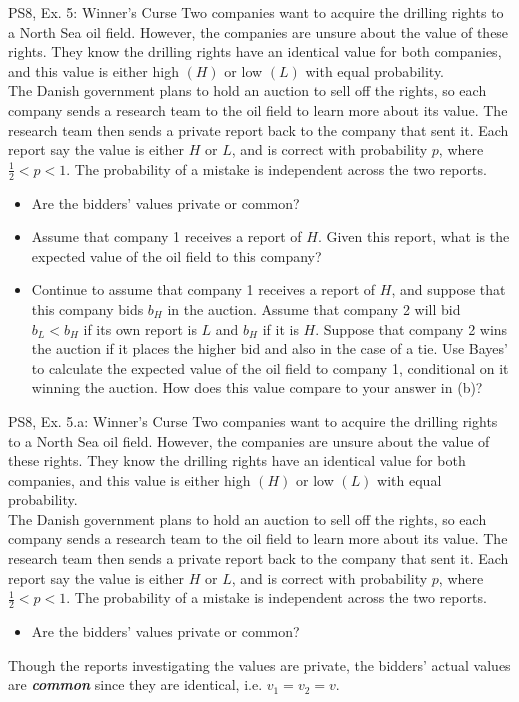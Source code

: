 \begin{frame}{PS8, Ex. 5: Winner's Curse}
      Two companies want to acquire the drilling rights to a North Sea oil field. However, the companies are unsure about the value of these rights. They know the drilling rights have an identical value for both companies, and this value is either high $(H)$ or low $(L)$ with equal probability.\\\medskip
      The Danish government plans to hold an auction to sell off the rights, so each company sends a research team to the oil field to learn more about its value. The research team then sends a private report back to the company that sent it. Each report say the value is either $H$ or $L$, and is correct with probability $p$, where $\frac{1}{2} < p < 1$. The probability of a mistake is independent across the two reports.
      \begin{itemize}
        \item[(a)] Are the bidders’ values private or common?
        \item[(b)] Assume that company 1 receives a report of $H$. Given this report, what is the expected value of the oil field to this company?
        \item[(c)] Continue to assume that company 1 receives a report of $H$, and suppose that this company bids $b_H$ in the auction. Assume that company 2 will bid $b_L < b_H$ if its own report is $L$ and $b_H$ if it is $H$. Suppose that company 2 wins the auction if it places the higher bid and also in the case of a tie. Use Bayes’ to calculate the expected value of the oil field to company 1, conditional on it winning the auction. How does this value compare to your answer in (b)?
      \end{itemize}
      \vfill\null
\end{frame}


\begin{frame}{PS8, Ex. 5.a: Winner's Curse}
    Two companies want to acquire the drilling rights to a North Sea oil field. However, the companies are unsure about the value of these rights. They know the drilling rights have an identical value for both companies, and this value is either high $(H)$ or low $(L)$ with equal probability.\\\medskip
    The Danish government plans to hold an auction to sell off the rights, so each company sends a research team to the oil field to learn more about its value. The research team then sends a private report back to the company that sent it. Each report say the value is either $H$ or $L$, and is correct with probability $p$, where $\frac{1}{2} < p < 1$. The probability of a mistake is independent across the two reports.
    \begin{itemize}
      \item[(a)] Are the bidders’ values private or common?
    \end{itemize}
    Though the reports investigating the values are private, the bidders' actual values are \textit{\textbf{common}} since they are identical, i.e. $v_1=v_2=v$.
    \vfill\null
\end{frame}


